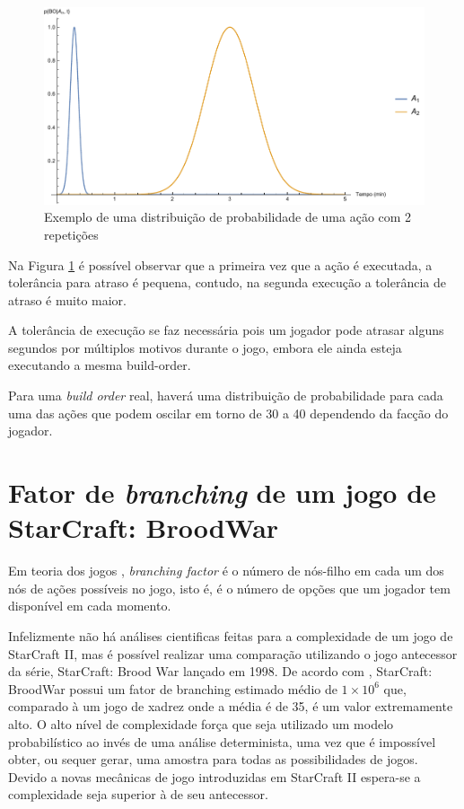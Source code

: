 \begin{figure}[htb]
	\caption{\label{fig:rev-distribuicao-exemplo}Exemplo de uma distribuição de probabilidade de uma ação com 2 repetições}
	\begin{center}
	    \includegraphics[width=\linewidth]{../Mathematica/Distribuicao1.pdf}
	\end{center}
\end{figure}

Na Figura \ref{fig:rev-distribuicao-exemplo} é possível observar que a primeira vez que a ação é executada, a tolerância para atraso é pequena, contudo, na segunda execução a tolerância de atraso é muito maior.

A tolerância de execução se faz necessária pois um jogador pode atrasar alguns segundos por múltiplos motivos durante o jogo, embora ele ainda esteja executando a mesma build-order.

Para uma \textit{build order} real, haverá uma distribuição de probabilidade para cada uma das ações que podem oscilar em torno de 30 a 40 dependendo da facção do jogador.

		\section{Fator de \textit{branching} de um jogo de StarCraft: BroodWar}
Em teoria dos jogos , \textit{branching factor} é o número de nós-filho em cada um dos nós de ações possíveis no jogo, isto é, é o número de opções que um jogador tem disponível em cada momento.

Infelizmente não há análises cientificas feitas para a complexidade de um jogo de StarCraft II, mas é possível realizar uma comparação utilizando o jogo antecessor da série, StarCraft: Brood War lançado em 1998. De acordo com \cite{weber2009data}, StarCraft: BroodWar possui um fator de branching estimado médio de $1 \times 10^6$ que, comparado à um jogo de xadrez onde a média é de 35, é um valor extremamente alto. O alto nível de complexidade força que seja utilizado um modelo probabilístico ao invés de uma análise determinista, uma vez que é impossível obter, ou sequer gerar, uma amostra para todas as possibilidades de jogos. Devido a novas mecânicas de jogo introduzidas em StarCraft II espera-se a complexidade seja superior à de seu antecessor.

